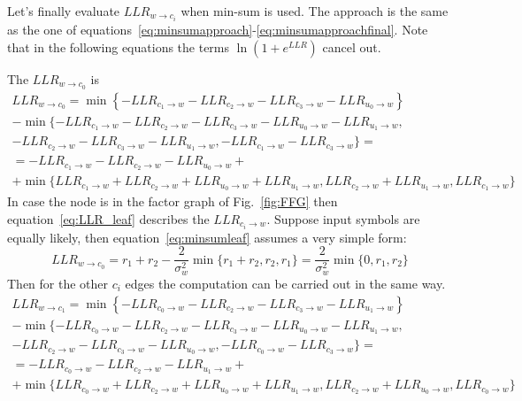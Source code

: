 \documentclass[10pt]{article}
\begin{document}
Let's finally evaluate $LLR_{w \rightarrow c_i}$ when min-sum is used. The approach is the same as the one of equations~\eqref{eq:minsumapproach}-\eqref{eq:minsumapproachfinal}. 
Note that in the following equations the terms $\ln(1+e^{LLR})$ cancel out. 

The $LLR_{w \rightarrow c_0}$ is
\begin{multline}\label{eq:minsumleaf}
	LLR_{w \rightarrow c_0} = \min\left\{-LLR_{c_1 \rightarrow w}-LLR_{c_2\rightarrow w}-LLR_{c_3 \rightarrow w}-LLR_{u_0 \rightarrow w}\right\} \\ - \min\{-LLR_{c_1 \rightarrow w}-LLR_{c_2\rightarrow w}-LLR_{c_3 \rightarrow w}-LLR_{u_0 \rightarrow w}-LLR_{u_1 \rightarrow w}, \\ -LLR_{c_2\rightarrow w}-LLR_{c_3 \rightarrow w}-LLR_{u_1 \rightarrow w}, -LLR_{c_1 \rightarrow w}-LLR_{c_3 \rightarrow w}\}
	 = \\
	= - LLR_{c_1 \rightarrow w} - LLR_{c_2\rightarrow w} - LLR_{u_0 \rightarrow w} +  \\ + \min\{LLR_{c_1 \rightarrow w}+LLR_{c_2\rightarrow w}+LLR_{u_0 \rightarrow w}+LLR_{u_1 \rightarrow w}, LLR_{c_2\rightarrow w}+LLR_{u_1 \rightarrow w}, LLR_{c_1 \rightarrow w}\}
\end{multline}
In case the node is in the factor graph of Fig.~\ref{fig:FFG} then equation~\eqref{eq:LLR_leaf} describes the $LLR_{c_i \rightarrow w}$. Suppose input symbols are equally likely, then equation~\eqref{eq:minsumleaf} assumes a very simple form:
\begin{equation}
	LLR_{w \rightarrow c_0} = r_1 + r_2 - \frac{2}{\sigma_w^2} \min\{r_1+r_2, r_2, r_1\} = \frac{2}{\sigma_w^2}\min\{0, r_1, r_2\}
\end{equation}
Then for the other $c_i$ edges the computation can be carried out in the same way.
\begin{multline}
	LLR_{w \rightarrow c_1} = \min\left\{-LLR_{c_0 \rightarrow w}-LLR_{c_2\rightarrow w}-LLR_{c_3 \rightarrow w}-LLR_{u_1 \rightarrow w}\right\} \\ - \min\{-LLR_{c_0 \rightarrow w}-LLR_{c_2\rightarrow w}-LLR_{c_3 \rightarrow w}-LLR_{u_0 \rightarrow w}-LLR_{u_1 \rightarrow w}, \\ -LLR_{c_2\rightarrow w}-LLR_{c_3 \rightarrow w}-LLR_{u_0 \rightarrow w}, -LLR_{c_0 \rightarrow w}-LLR_{c_3 \rightarrow w}\}
	 = \\
	= - LLR_{c_0 \rightarrow w} - LLR_{c_2\rightarrow w} - LLR_{u_1 \rightarrow w}+  \\ + \min\{LLR_{c_0 \rightarrow w}+LLR_{c_2\rightarrow w}+LLR_{u_0 \rightarrow w}+LLR_{u_1 \rightarrow w}, LLR_{c_2\rightarrow w}+LLR_{u_0 \rightarrow w}, LLR_{c_0 \rightarrow w}\}
\end{multline}
\end{document}
